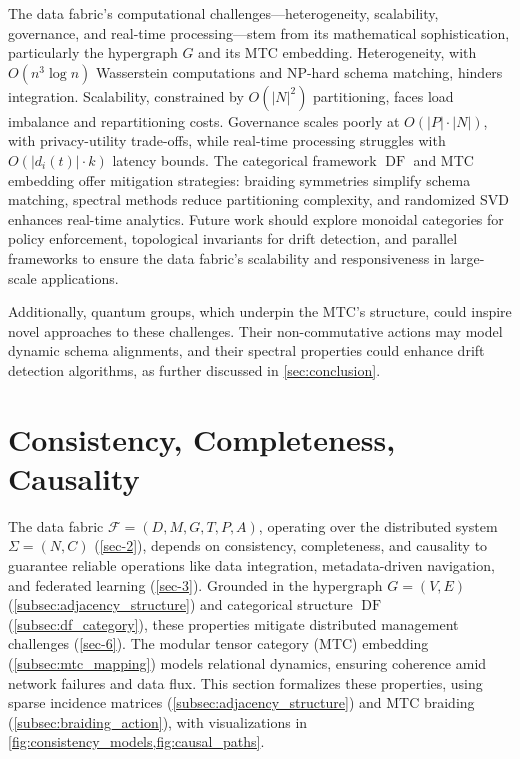 \documentclass{amsart}
\newcommand\cF{\mathcal{F}}
\DeclareMathOperator\DF{DF}
\begin{document}


The data fabric’s computational challenges—heterogeneity, scalability, governance, and real-time processing—stem from its mathematical sophistication, particularly the hypergraph \( G \) and its MTC embedding. Heterogeneity, with \( O(n^3 \log n) \) Wasserstein computations and NP-hard schema matching, hinders integration. Scalability, constrained by \( O(|N|^2) \) partitioning, faces load imbalance and repartitioning costs. Governance scales poorly at \( O(|P| \cdot |N|) \), with privacy-utility trade-offs, while real-time processing struggles with \( O(|d_i(t)| \cdot k) \) latency bounds. The categorical framework \( \DF \) and MTC embedding offer mitigation strategies: braiding symmetries simplify schema matching, spectral methods reduce partitioning complexity, and randomized SVD enhances real-time analytics. Future work should explore monoidal categories for policy enforcement, topological invariants for drift detection, and parallel frameworks to ensure the data fabric’s scalability and responsiveness in large-scale applications.


Additionally, quantum groups, which underpin the MTC’s structure, could inspire novel approaches to these challenges. Their non-commutative actions may model dynamic schema alignments, and their spectral properties could enhance drift detection algorithms, as further discussed in \cref{sec:conclusion}.

\section{Consistency, Completeness, Causality} \label{sec-7}
The data fabric $  \cF = (D, M, G, T, P, A)  $, operating over the distributed system $  \Sigma = (N, C)  $ (\cref{sec-2}), depends on consistency, completeness, and causality to guarantee reliable operations like data integration, metadata-driven navigation, and federated learning (\cref{sec-3}). Grounded in the hypergraph $  G = (V, E)  $ (\cref{subsec:adjacency_structure}) and categorical structure $  \DF  $ (\cref{subsec:df_category}), these properties mitigate distributed management challenges (\cref{sec-6}). The modular tensor category (MTC) embedding (\cref{subsec:mtc_mapping}) models relational dynamics, ensuring coherence amid network failures and data flux. This section formalizes these properties, using sparse incidence matrices (\cref{subsec:adjacency_structure}) and MTC braiding (\cref{subsec:braiding_action}), with visualizations in \cref{fig:consistency_models,fig:causal_paths}.
\end{document}
